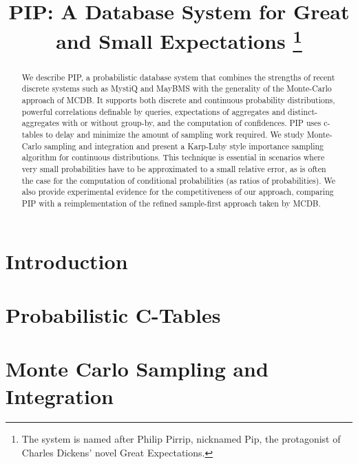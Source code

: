 \documentclass{sig-alternate}
\title{PIP: A Database System for Great and Small Expectations%
\thanks{The
system is named after Philip Pirrip, nicknamed Pip, the protagonist of
Charles Dickens' novel Great Expectations.}}
\date{}
\begin{document}



\toappear{}


\maketitle



\begin{abstract}
We describe PIP, a probabilistic database system
that combines the strengths of
recent discrete systems such as MystiQ and MayBMS with the generality of
the Monte-Carlo approach of MCDB. It supports both discrete and
continuous probability distributions, powerful correlations definable
by queries, expectations of aggregates and distinct-aggregates with or
without  group-by,  and the computation of confidences.
%
PIP uses c-tables to delay and minimize the amount of sampling work required.
We study Monte-Carlo sampling and integration and
present a Karp-Luby style importance
sampling algorithm for continuous distributions.
This technique is essential
in scenarios where very small probabilities have to be approximated to a small
relative error, as is often the case for the computation of conditional
probabilities (as ratios of probabilities).
%
We also provide experimental evidence for the competitiveness
of our approach, comparing PIP with a reimplementation of the
refined sample-first approach taken by MCDB. 
\end{abstract}



\section{Introduction}
\label{sec:introduction}


\section{Probabilistic C-Tables}
\label{sec:background}


\section{Monte Carlo Sampling and Integration}
\label{sec:sampling}

\end{document}
